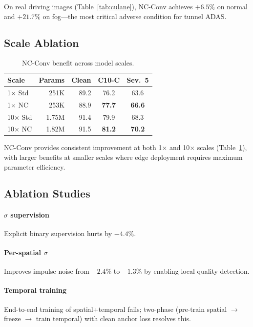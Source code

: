 \documentclass[journal]{IEEEtran}
\begin{document}
On real driving images (Table~\ref{tab:culane}), NC-Conv achieves $+6.5\%$ on normal and $+21.7\%$ on fog---the most critical adverse condition for tunnel ADAS.


\subsection{Scale Ablation}
\label{sec:scale_exp}

\begin{table}[t]
\centering
\caption{NC-Conv benefit across model scales.}
\label{tab:scale}
\small
\begin{tabular}{@{}lrrcc@{}}
\toprule
\textbf{Scale} & \textbf{Params} & \textbf{Clean} & \textbf{C10-C} & \textbf{Sev.~5} \\
\midrule
1$\times$ Std & 251K & 89.2 & 76.2 & 63.6 \\
1$\times$ NC  & 253K & 88.9 & \textbf{77.7} & \textbf{66.6} \\
\midrule
10$\times$ Std & 1.75M & 91.4 & 79.9 & 68.3 \\
10$\times$ NC  & 1.82M & 91.5 & \textbf{81.2} & \textbf{70.2} \\
\bottomrule
\end{tabular}
\end{table}

NC-Conv provides consistent improvement at both 1$\times$ and 10$\times$ scales (Table~\ref{tab:scale}), with larger benefits at smaller scales where edge deployment requires maximum parameter efficiency.


\subsection{Ablation Studies}
\label{sec:ablation}

\paragraph{$\sigma$ supervision}
Explicit binary supervision hurts by $-4.4\%$.

\paragraph{Per-spatial $\sigma$}
Improves impulse noise from $-2.4\%$ to $-1.3\%$ by enabling local quality detection.

\paragraph{Temporal training}
End-to-end training of spatial+temporal fails; two-phase (pre-train spatial $\to$ freeze $\to$ train temporal) with clean anchor loss resolves this.
\end{document}
